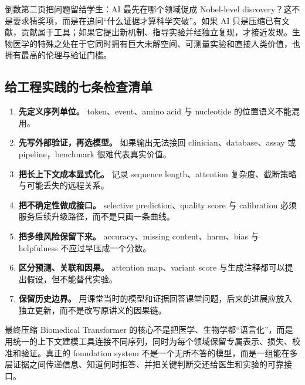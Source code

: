 倒数第二页把问题留给学生：AI 最先在哪个领域促成 Nobel-level discovery？这不是要求猜奖项，而是在追问“什么证据才算科学突破”。如果 AI 只是压缩已有文献，贡献属于工具；如果它提出新机制、指导实验并经独立复现，才接近发现。生物医学的特殊之处在于它同时拥有巨大未解空间、可测量实验和直接人类价值，也拥有最高的伦理与验证门槛。




\subsection{给工程实践的七条检查清单}

\begin{enumerate}
  \item \textbf{先定义序列单位。} token、event、amino acid 与 nucleotide 的位置语义不能混用。
  \item \textbf{先写外部验证，再选模型。} 如果输出无法接回 clinician、database、assay 或 pipeline，benchmark 很难代表真实价值。
  \item \textbf{把长上下文成本显式化。} 记录 sequence length、attention 复杂度、截断策略与可能丢失的远程关系。
  \item \textbf{把不确定性做成接口。} selective prediction、quality score 与 calibration 必须服务后续升级路径，而不是只画一条曲线。
  \item \textbf{把多维风险保留下来。} accuracy、missing content、harm、bias 与 helpfulness 不应过早压成一个分数。
  \item \textbf{区分预测、关联和因果。} attention map、variant score 与生成注释都可以提出假设，但不能替代实验。
  \item \textbf{保留历史边界。} 用课堂当时的模型和证据回答课堂问题，后来的进展应放入独立更新，而不是改写原讲义的因果链。
\end{enumerate}

\begin{importantbox}{最终压缩}
Biomedical Transformer 的核心不是把医学、生物学都“语言化”，而是用统一的上下文建模工具连接不同序列，同时为每个领域保留专属表示、损失、校准和验证。真正的 foundation system 不是一个无所不答的模型，而是一组能在多层证据之间传递信息、知道何时拒答、并把关键判断交还给医生和实验的可靠接口。
\end{importantbox}

